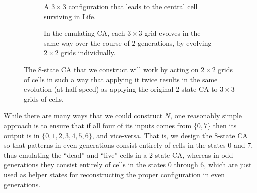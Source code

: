 \begin{figure}[!htb]
	\centering
	\begin{subfigure}{.37\textwidth}
		\centering
		  
		\caption{A $3 \times 3$ configuration that leads to the central cell surviving in Life.}
		\label{fig:0e0p_single_transition}
	\end{subfigure} \hfill \begin{subfigure}{.6\textwidth}
		\centering
		    
		\caption{In the emulating CA, each $3 \times 3$ grid evolves in the same way over the course of $2$ generations, by evolving $2 \times 2$ grids individually.}
		\label{fig:0e0p_double_transition_em}
	\end{subfigure}
	\caption{The $8$-state CA that we construct will work by acting on $2 \times 2$ grids of cells in such a way that applying it twice results in the same evolution (at half speed) as applying the original $2$-state CA to $3 \times 3$ grids of cells.}\label{fig:0e0p_double_transition}
\end{figure}

While there are many ways that we could construct $N$, one reasonably simple approach is to ensure that if all four of its inputs comes from $\{0,7\}$ then its output is in $\{0,1,2,3,4,5,6\}$, and vice-versa. That is, we design the $8$-state CA so that patterns in even generations consist entirely of cells in the states $0$ and $7$, thus emulating the ``dead'' and ``live'' cells in a $2$-state CA, whereas in odd generations they consist entirely of cells in the states $0$ through $6$, which are just used as helper states for reconstructing the proper configuration in even generations.

